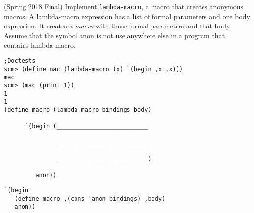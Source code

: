 \begin{blocksection}
\question (Spring 2018 Final) 
\newline
Implement \texttt{lambda-macro}, a macro that creates anonymous macros. A lambda-macro expression has
a list of formal parameters and one body expression. It creates a \emph{macro} with those formal parameters and
that body. Assume that the symbol anon is not use anywhere else in a program that contains lambda-macro.


\begin{lstlisting}
;Doctests
scm> (define mac (lambda-macro (x) `(begin ,x ,x)))
mac
scm> (mac (print 1))
1
1
(define-macro (lambda-macro bindings body)

      `(begin (__________________________
                   
               __________________________ 

               __________________________)

         anon))
\end{lstlisting}
\begin{solution}
\begin{lstlisting}
`(begin 
   (define-macro ,(cons 'anon bindings) ,body)
   anon))
\end{lstlisting}
\end{solution}
\end{blocksection}
